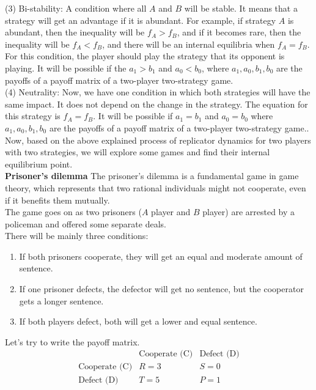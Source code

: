 \documentclass{article}
\begin{document}
(3) Bi-stability: A condition where all $A$ and $B$ will be stable. It means that a strategy will get an advantage if it is abundant. For example, if strategy $A$ is abundant, then the inequality will be $f_A>f_B$, and if it becomes rare, then the inequality will be $f_A<f_B$, and there will be an internal equilibria when $f_A=f_B$. For this condition, the player should play the strategy that its opponent is playing. It will be possible if the $a_1>b_1$ and $a_0<b_0$, where $a_1,a_0,b_1,b_0$ are the payoffs of a payoff matrix of a two-player two-strategy game.\\
(4) Neutrality: Now, we have one condition in which both strategies will have the same impact. It does not depend on the change in the strategy. The equation for this strategy is $f_A=f_B$. It will be possible if $a_1=b_1$ and $a_0=b_0$ where $a_1,a_0,b_1,b_0$ are the payoffs of a payoff matrix of a two-player two-strategy  game.\citep{Gokhale2011}.\\
Now, based on the above explained process of replicator dynamics for two players with two strategies, we will explore some games and find their internal equilibrium point.\\
\textbf{Prisoner's dilemma}
\newline
The prisoner's dilemma is a fundamental game in game theory, which represents that two rational individuals might not cooperate, even if it benefits them mutually.\\
The game goes on as two prisoners ($A$ player and $B$ player) are arrested by a policeman and offered some separate deals.\\
There will be mainly three conditions:
\begin{enumerate}
\item If both prisoners cooperate, they will get an equal and moderate amount of sentence.
\item If one prisoner defects, the defector will get no sentence, but the cooperator gets a longer sentence.
\item If both players defect, both will get a lower and equal sentence.
\end{enumerate}
Let's try to write the payoff matrix.
\[
\begin{array}{c|cc}
   & \text{Cooperate (C)} & \text{Defect (D)} \\
  \hline
  \text{Cooperate (C)} & R = 3 & S = 0 \\
  \text{Defect (D)} & T = 5 & P = 1 \\
\end{array}
\]
\end{document}
